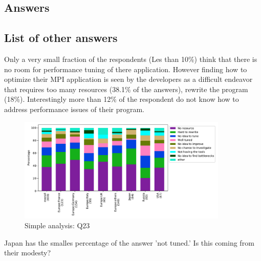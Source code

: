 
\subsection{Answers}


\subsection{List of other answers}
\begin{itemize}

\end{itemize}

Only a very small fraction of the respondents (Les than 10\%) think that there
is no room for performance tuning of there application. However finding how to
optimize their MPI application is seen by the developers as a difficult
endeavor that requires too many resources (38.1\% of the answers), rewrite the
program (18\%). Interestingly more than 12\% of the respondent do not know how to
address performance issues of their program.  

\begin{figure}[htb]
\begin{center}
\includegraphics[width=10cm]{../pdfs/Q23.pdf}
\caption{Simple analysis: Q23}
\label{fig:Q23}
\end{center}
\end{figure}

Japan has the smalles percentage of the answer 'not tuned.' Is this
coming from their modesty?
